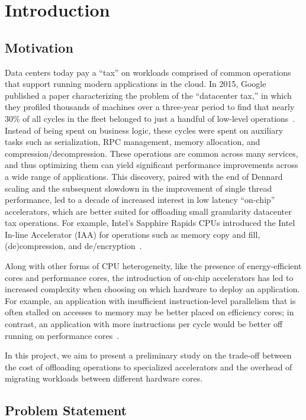 \section{Introduction}

\subsection{Motivation}

Data centers today pay a ``tax'' on workloads comprised of common operations that support running modern applications in the cloud.
In 2015, Google published a paper characterizing the problem of the ``datacenter tax,'' in which they profiled thousands of machines over a three-year period to find that nearly 30\% of all cycles in the fleet belonged to just a handful of low-level operations~\cite{kanev2015profiling}.
Instead of being spent on business logic, these cycles were spent on auxiliary tasks such as serialization, RPC management, memory allocation, and compression/decompression.
These operations are common across many services, and thus optimizing them can yield significant performance improvements across a wide range of applications.
This discovery, paired with the end of Dennard scaling and the subsequent slowdown in the improvement of single thread performance, led to a decade of increased interest in low latency ``on-chip'' accelerators, which are better suited for offloading small granularity datacenter tax operations.
For example, Intel's Sapphire Rapids CPUs introduced the Intel In-line Accelerator (IAA) for operations such as memory copy and fill, (de)compression, and de/encryption~\cite{yuan2024intel}.

Along with other forms of CPU heterogeneity, like the presence of energy-efficient cores and performance cores, the introduction of on-chip accelerators has led to increased complexity when choosing on which hardware to deploy an application.
For example, an application with insufficient instruction-level parallelism that is often stalled on accesses to memory may be better placed on efficiency cores; in contrast, an application with more instructions per cycle would be better off running on performance cores~\cite{kanev2015profiling}.

In this project, we aim to present a preliminary study on the trade-off between the cost of offloading operations to specialized accelerators and the overhead of migrating workloads between different hardware cores.

\subsection{Problem Statement}

